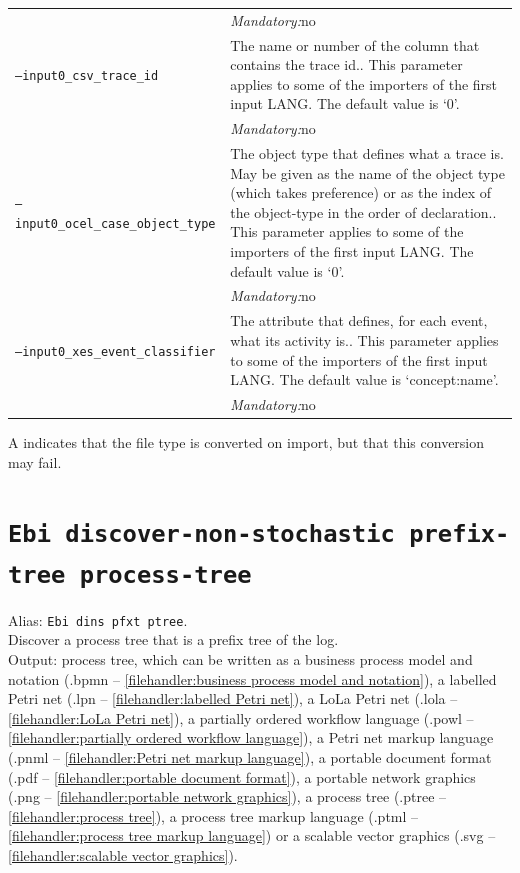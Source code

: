 {\begin{tabularx}{\linewidth}{lX}
&\textit{Mandatory:}\quad no\\
\texttt{--input0\_csv\_trace\_id} & The name or number of the column that contains the trace id.. This parameter applies to some of the importers of the first input LANG. The default value is `0'.\\
&\textit{Mandatory:}\quad no\\
\texttt{--input0\_ocel\_case\_object\_type} & The object type that defines what a trace is. May be given as the name of the object type (which takes preference) or as the index of the object-type in the order of declaration.. This parameter applies to some of the importers of the first input LANG. The default value is `0'.\\
&\textit{Mandatory:}\quad no\\
\texttt{--input0\_xes\_event\_classifier} & The attribute that defines, for each event, what its activity is.. This parameter applies to some of the importers of the first input LANG. The default value is `concept:name'.\\
&\textit{Mandatory:}\quad no\\
\bottomrule
\end{tabularx}
A \textdagger{} indicates that the file type is converted on import, but that this conversion may fail.
\clearpage\section{\texttt{Ebi discover-non-stochastic prefix-tree process-tree}}
\label{command:Ebi discover-non-stochastic prefix-tree process-tree}
Alias: \texttt{Ebi dins pfxt ptree}.\\
Discover a process tree that is a prefix tree of the log.\\
\noindent Output: process tree, which can be written as a business process model and notation (.bpmn -- \cref{filehandler:business process model and notation}), a labelled Petri net (.lpn -- \cref{filehandler:labelled Petri net}), a LoLa Petri net (.lola -- \cref{filehandler:LoLa Petri net}), a partially ordered workflow language (.powl -- \cref{filehandler:partially ordered workflow language}), a Petri net markup language (.pnml -- \cref{filehandler:Petri net markup language}), a portable document format (.pdf -- \cref{filehandler:portable document format}), a portable network graphics (.png -- \cref{filehandler:portable network graphics}), a process tree (.ptree -- \cref{filehandler:process tree}), a process tree markup language (.ptml -- \cref{filehandler:process tree markup language}) or a scalable vector graphics (.svg -- \cref{filehandler:scalable vector graphics}).\\
}
